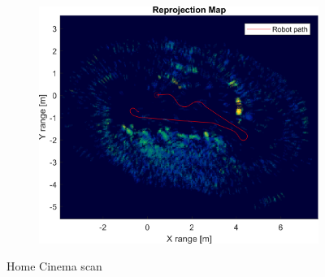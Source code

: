 \begin{figure}[htbp]
    \begin{subfigure}[t]{0.5\linewidth}
        \centering
        \includegraphics[width=\linewidth,max height=.475\textheight]{gfx/results/homecinema_reprojection.png}
    \end{subfigure}%
    \caption{Home Cinema scan}
\end{figure}

